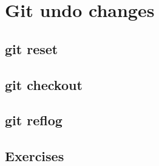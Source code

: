 \section{Git undo changes}
\begin{frame}[fragile]
    \slidetitle
\end{frame}

\subsection{git reset}
\begin{frame}[fragile]
    \subslidetitle
\end{frame}

\subsection{git checkout}
\begin{frame}[fragile]
    \subslidetitle
\end{frame}

\subsection{git reflog}
\begin{frame}[fragile]
    \subslidetitle
\end{frame}

\subsection{Exercises}
\begin{frame}[fragile]
  \subslidetitle
\end{frame}
